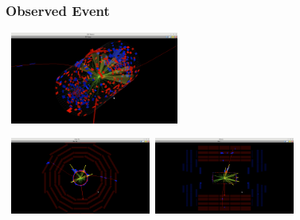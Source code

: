 \documentclass{beamer}
\begin{document}
\begin{frame}
\frametitle{\Huge{Observed Event}}
\begin{tcolorbox}[colback=UNL@Cream!5,colframe=UMN@Maroon!40,title=\textcolor{black}{\textbf{3-D View}}]
 \centering
\mbox{
\includegraphics[height=3cm,width= 0.7\paperwidth]{THESISPLOTS/Observed-Event-3D-Delayed-Photon.png}} 
 \end{tcolorbox}
 
 \begin{tcolorbox}[colback=UNL@Cream!5,colframe=UMN@Maroon!40,title=\textcolor{black}{\textbf{Transverse~(left) and $\rho-Z$ (Right) View}}]
 \centering
\mbox{
\includegraphics[height=2.5cm,width=0.35\paperwidth]{THESISPLOTS/Transverse-View-Delayed-Photn-Event.png}
 \quad
\includegraphics[height=2.5cm,width=0.35\paperwidth]{THESISPLOTS/Delayedphotonrho-Z-view.png}
} 
 \end{tcolorbox}

\end{frame}
\end{document}

